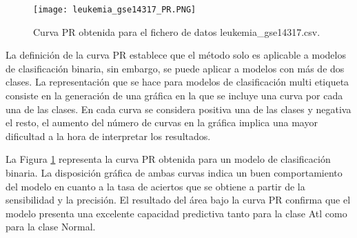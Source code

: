 \bigbreak

\begin{figure}[htp]
    \centering
    \texttt{[image: leukemia\_gse14317\_PR.PNG]}
    \caption{Curva PR obtenida para el fichero de datos leukemia\_gse14317.csv.}
    \label{fig:6}
\end{figure}

La definición de la curva PR establece que el método solo es aplicable a modelos de clasificación binaria, sin embargo, se puede aplicar a modelos con más de dos clases. La representación que se hace para modelos de clasificación multi etiqueta consiste en la generación de una gráfica en la que se incluye una curva por cada una de las clases. En cada curva se considera positiva una de las clases y negativa el resto, el aumento del número de curvas en la gráfica implica una mayor dificultad a la hora de interpretar los resultados.

\bigbreak

La Figura \ref{fig:6} representa la curva PR obtenida para un modelo de clasificación binaria. La disposición gráfica de ambas curvas indica un buen comportamiento del modelo en cuanto a la tasa de aciertos que se obtiene a partir de la sensibilidad y la precisión. El resultado del área bajo la curva PR confirma que el modelo presenta una excelente capacidad predictiva tanto para la clase Atl como para la clase Normal.

\clearpage
